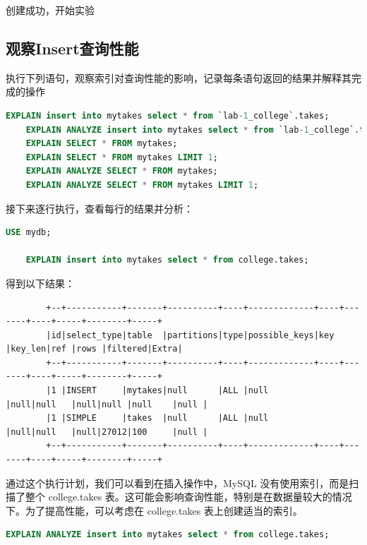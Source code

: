 \documentclass{article}
\begin{document}
	创建成功，开始实验
	
	\subsection{观察Insert查询性能}
	
	执行下列语句，观察索引对查询性能的影响，记录每条语句返回的结果并解释其完成的操作
	
	\begin{lstlisting}[language=sql, title=索引对查询性能的影响 - 总, tabsize=4]
	EXPLAIN insert into mytakes select * from `lab-1_college`.takes;
	EXPLAIN ANALYZE insert into mytakes select * from `lab-1_college`.takes;
	EXPLAIN SELECT * FROM mytakes;
	EXPLAIN SELECT * FROM mytakes LIMIT 1;
	EXPLAIN ANALYZE SELECT * FROM mytakes;
	EXPLAIN ANALYZE SELECT * FROM mytakes LIMIT 1;
	\end{lstlisting}
	
	接下来逐行执行，查看每行的结果并分析：
	
	\begin{lstlisting}[language=sql, title=索引对查询性能的影响, tabsize=4]
	USE mydb;
	
	EXPLAIN insert into mytakes select * from college.takes;
	\end{lstlisting}
	
	得到以下结果：
	
	\begin{verbatim}
		+--+-----------+-------+----------+----+-------------+----+-------+----+-----+--------+-----+
		|id|select_type|table  |partitions|type|possible_keys|key |key_len|ref |rows |filtered|Extra|
		+--+-----------+-------+----------+----+-------------+----+-------+----+-----+--------+-----+
		|1 |INSERT     |mytakes|null      |ALL |null         |null|null   |null|null |null    |null |
		|1 |SIMPLE     |takes  |null      |ALL |null         |null|null   |null|27012|100     |null |
		+--+-----------+-------+----------+----+-------------+----+-------+----+-----+--------+-----+
	\end{verbatim}
	
	通过这个执行计划，我们可以看到在插入操作中，MySQL 没有使用索引，而是扫描了整个 college.takes 表。这可能会影响查询性能，特别是在数据量较大的情况下。为了提高性能，可以考虑在 college.takes 表上创建适当的索引。
	
	\begin{lstlisting}[language=sql, title=索引对查询性能的影响, tabsize=4]
	EXPLAIN ANALYZE insert into mytakes select * from college.takes;
	\end{lstlisting}
	
\end{document}
